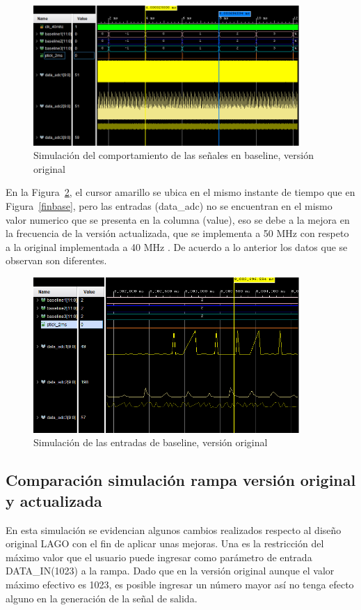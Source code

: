 \begin{figure}[H]
\includegraphics[width=0.9\textwidth]{Figs/baselineori.PNG} 
\centering
\caption{Simulación del comportamiento de las señales en baseline, versión original}
\label{actu4ms}
\end{figure}

En la Figura~\ref{baseor}, el cursor amarillo se ubica en el mismo instante de tiempo que en Figura~\ref{finbase}, pero las entradas (data\_adc) no se encuentran en el mismo valor numerico que se presenta en la columna (value), eso se debe a la mejora en la frecuencia de la versión actualizada, que se implementa a 50 MHz con respeto a la original implementada a 40 MHz . De acuerdo a lo anterior los datos que se observan son diferentes.

\begin{figure}[H]
\includegraphics[width=0.9\textwidth]{Figs/zombase.PNG} 
\centering
\caption{Simulación de las entradas de baseline, versión original}
\label{baseor}
\end{figure}

\subsection{Comparación simulación rampa versión original y actualizada}
En esta simulación se evidencian algunos cambios realizados respecto al diseño original LAGO con el fin de aplicar unas mejoras. Una es la restricción del máximo valor que el usuario puede ingresar como parámetro de entrada DATA\_IN(1023) a la rampa.
Dado que en la versión original aunque el valor máximo efectivo es 1023, es posible ingresar un número mayor así no tenga efecto alguno en la generación de la señal de salida.

